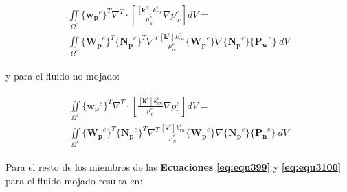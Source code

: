 \begin{ceqn} %
\begin{gather}\label{eq:equ3101}
\begin{multlined}
\iint \limits_{\Omega^e}  \{\mathbf{w_p}^e\}^T \nabla^T  \cdot \left[\frac{[\mathbf{k}^e] k_{rw}^e}{\mu_w^e} \nabla p_w^e\right] dV = \\[4pt]
\iint \limits_{\Omega^e} \{\mathbf{W_p}^e\}^T \{\mathbf{N_p}^e\}^T \nabla^T  \frac{[\mathbf{k}^e] k_{rw}^e}{\mu_w^e} \{\mathbf{W_p}^e\} \nabla \{\mathbf{N_p}^e\} \{\mathbf{P_w}^e\}\ dV
\end{multlined}
\end{gather}   
\end{ceqn}
 
 y para el fluido no-mojado:
 
\begin{ceqn} %
\begin{gather}\label{eq:equ3102}
\begin{multlined}
\iint \limits_{\Omega^e}  \{\mathbf{w_p}^e\}^T \nabla^T \cdot \left[\frac{[\mathbf{k}^e] k_{rn}^e}{\mu_n^e} \nabla p_n^e\right] dV = \\[4pt]
\iint \limits_{\Omega^e} \{\mathbf{W_p}^e\}^T \{\mathbf{N_p}^e\}^T \nabla^T  \frac{[\mathbf{k}^e] k_{rn}^e}{\mu_n^e} \{\mathbf{W_p}^e\} \nabla \{\mathbf{N_p}^e\} \{\mathbf{P_n}^e\}\ dV
\end{multlined}
\end{gather}   
\end{ceqn}
 
\newpage

Para el resto de los miembros de las \textbf{Ecuaciones} \textbf{\ref{eq:equ399}}  y \textbf{\ref{eq:equ3100}} para el fluido mojado resulta en:

